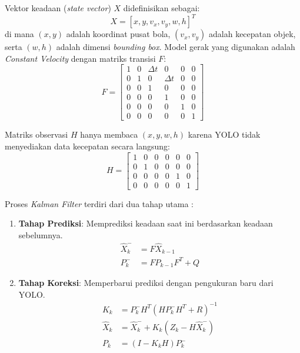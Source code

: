 \documentclass[12pt,a4paper]{article}
\begin{document}
Vektor keadaan (\textit{state vector}) $X$ didefinisikan sebagai:
\begin{equation}
X = [x, y, v_x, v_y, w, h]^T
\end{equation}
di mana $(x, y)$ adalah koordinat pusat bola, $(v_x, v_y)$ adalah kecepatan objek, serta $(w, h)$ adalah dimensi \textit{bounding box}. Model gerak yang digunakan adalah \textit{Constant Velocity} dengan matriks transisi $F$:
\begin{equation}
F = \begin{bmatrix}
1 & 0 & \Delta t & 0 & 0 & 0 \\
0 & 1 & 0 & \Delta t & 0 & 0 \\
0 & 0 & 1 & 0 & 0 & 0 \\
0 & 0 & 0 & 1 & 0 & 0 \\
0 & 0 & 0 & 0 & 1 & 0 \\
0 & 0 & 0 & 0 & 0 & 1
\end{bmatrix}
\end{equation}

Matriks observasi $H$ hanya membaca $(x, y, w, h)$ karena YOLO tidak menyediakan data kecepatan secara langsung:
\begin{equation}
H = \begin{bmatrix}
1 & 0 & 0 & 0 & 0 & 0 \\
0 & 1 & 0 & 0 & 0 & 0 \\
0 & 0 & 0 & 0 & 1 & 0 \\
0 & 0 & 0 & 0 & 0 & 1
\end{bmatrix}
\end{equation}

Proses \textit{Kalman Filter} terdiri dari dua tahap utama \cite{Ultralytics2025}:
\begin{enumerate}
    \item \textbf{Tahap Prediksi}: Memprediksi keadaan saat ini berdasarkan keadaan sebelumnya.
    \begin{align}
    \hat{X}_k^- &= F \hat{X}_{k-1} \\
    P_k^- &= F P_{k-1} F^T + Q
    \end{align}
    \item \textbf{Tahap Koreksi}: Memperbarui prediksi dengan pengukuran baru dari YOLO.
    \begin{align}
    K_k &= P_k^- H^T (H P_k^- H^T + R)^{-1} \\
    \hat{X}_k &= \hat{X}_k^- + K_k (Z_k - H \hat{X}_k^-) \\
    P_k &= (I - K_k H) P_k^-
    \end{align}
\end{enumerate}
\end{document}
